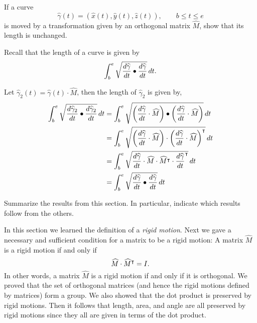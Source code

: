 \documentclass[newpage,hints,handout,12pt,noauthor,nooutcomes]{ximera}
\begin{document}
\begin{problem}
If a curve
\[
\hat{\gamma}(t) = (\hat{x}(t),\hat{y}(t),\hat{z}(t)),\qquad b\le t\le e
\]
is moved by a transformation given by an orthogonal matrix $\hat{M}$,
show that its length is unchanged.
\begin{hint}
  Recall that the length of a curve is given by
\[
\int_{b}^{e} \sqrt{\frac{d\widehat{\gamma}}{d t} \bullet \frac{d\widehat{\gamma}}{dt}}\,d t.
\]  
\end{hint}

\begin{freeResponse}
Let $\hat\gamma_{2}(t) = \hat\gamma(t) \cdot \hat{M}$, then the length of $\hat\gamma_{2}$ is given by,
\begin{align*}
\int_{b}^{e} \sqrt{\frac{d\widehat\gamma_{2}}{dt} \bullet \frac{d\widehat\gamma_{2}}{dt}}\,d t 
	&= \int_{b}^{e} \sqrt{ \left( \frac{d\widehat\gamma}{dt} \cdot \widehat{M} \right) \bullet 
	\left( \frac{d\widehat\gamma}{dt} \cdot \widehat{M} \right)}\,d t \\
	&= \int_{b}^{e} \sqrt{ \left( \frac{d\widehat\gamma}{dt} \cdot \widehat{M} \right) \cdot 
	\left( \frac{d\widehat\gamma}{dt} \cdot \widehat{M} \right)^\intercal}\,d t \\
	&= \int_{b}^{e} \sqrt{ \frac{d\widehat\gamma}{dt} \cdot \widehat{M} \cdot 
	 \widehat{M}^\intercal \cdot \frac{d\widehat\gamma}{dt}^\intercal}\,d t \\
	 &= \int_{b}^{e} \sqrt{ \frac{d\widehat\gamma}{dt} \bullet \frac{d\widehat\gamma}{dt}}\,d t
\end{align*}
\end{freeResponse}
\end{problem}


\begin{problem}
Summarize the results from this section. In particular, indicate which
results follow from the others.
\begin{freeResponse}
In this section we learned the definition of a \textit{rigid motion}. Next we gave a necessary and sufficient condition for a matrix to be a rigid motion: 
A matrix $\hat{M}$ is a rigid motion if and only if 
\[
\widehat{M}\cdot\widehat{M}^\intercal = I.
\]
In other words, a matrix $\hat{M}$ is a rigid motion if and only if it is orthogonal.
We proved that the set of orthogonal matrices (and hence the rigid motions defined by matrices) form a group. 
We also showed that the dot product is preserved by rigid motions. Then it follows that length, area, and angle are all preserved by rigid motions since they all are given in terms of the dot product. 


\end{freeResponse}
\end{problem}
\end{document}
